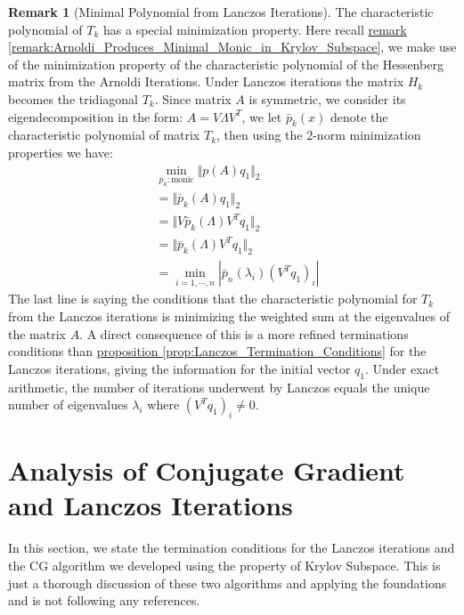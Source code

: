 \documentclass[]{article}
\theoremstyle{definition}
\newtheorem{remark}{Remark}[subsection]  %
\begin{document}
            \begin{remark}[Minimal Polynomial from Lanczos Iterations]\label{remark:Minimal_Polynomial_from_Lanczos_Iterations}
                The characteristic polynomial of $T_k$ has a special minimization property. Here recall \hyperref[remark:Arnoldi_Produces_Minimal_Monic_in_Krylov_Subspace]{remark \ref*{remark:Arnoldi_Produces_Minimal_Monic_in_Krylov_Subspace}}, we make use of the minimization property of the characteristic polynomial of the Hessenberg matrix from the Arnoldi Iterations. Under Lanczos iterations the matrix $H_k$ becomes the tridiagonal $T_k$. Since matrix $A$ is symmetric, we consider its eigendecomposition in the form: $A = V\Lambda V^T$, we let $\bar{p}_k(x)$ denote the characteristic polynomial of matrix $T_k$, then using the 2-norm minimization properties we have: 
                \begin{align}
                    & \min_{p_k:\text{monic}} \Vert p(A)q_1\Vert_2
                    \\
                    & =\Vert \overline{p}_k(A)q_1\Vert_2
                    \\
                    & = \Vert V \bar{p}_k(\Lambda)V^Tq_1\Vert_2
                    \\
                    & = \Vert \bar{p}_k(\Lambda)V^Tq_1\Vert_2
                    \\
                    &= \min_{i = 1, \cdots, n} | \bar{p}_n(\lambda_i)(V^Tq_1)_i|
                \end{align}
                The last line is saying the conditions that the characteristic polynomial for $T_k$ from the Lanczos iterations is minimizing the weighted sum at the eigenvalues of the matrix $A$. A direct consequence of this is a more refined terminations conditions than \hyperref[prop:Lanczos_Termination_Conditions]{proposition \ref*{prop:Lanczos_Termination_Conditions}} for the Lanczos iterations, giving the information for the initial vector $q_1$. Under exact arithmetic, the number of iterations underwent by Lanczos equals the unique number of eigenvalues $\lambda_i$ where $(V^Tq_1)_i \neq 0$. 
                
            \end{remark}
            
\section{Analysis of Conjugate Gradient and Lanczos Iterations}
    In this section, we state the termination conditions for the Lanczos iterations and the CG algorithm we developed using the property of Krylov Subspace. This is just a thorough discussion of these two algorithms and applying the foundations and is not following any references.
\end{document}
